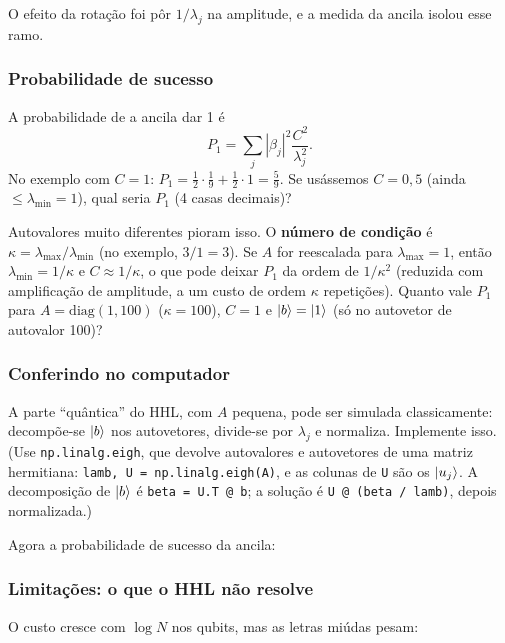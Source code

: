 O efeito da rotação foi pôr \(1/\lambda_j\) na amplitude, e a medida da ancila isolou esse ramo.

\subsubsection{Probabilidade de sucesso}\label{probabilidade-de-sucesso}

A probabilidade de a ancila dar 1 é
\[
P_1=\sum_j|\beta_j|^2\frac{C^2}{\lambda_j^2}.
\]
No exemplo com \(C=1\): \(P_1=\tfrac12\cdot\tfrac19+\tfrac12\cdot1=\tfrac59\). Se usássemos \(C=0{,}5\) (ainda \(\le\lambda_{\min}=1\)), qual seria \(P_1\) (4 casas decimais)?

Autovalores muito diferentes pioram isso. O \textbf{número de condição} é \(\kappa=\lambda_{\max}/\lambda_{\min}\) (no exemplo, \(3/1=3\)). Se \(A\) for reescalada para \(\lambda_{\max}=1\), então \(\lambda_{\min}=1/\kappa\) e \(C\approx1/\kappa\), o que pode deixar \(P_1\) da ordem de \(1/\kappa^2\) (reduzida com amplificação de amplitude, a um custo de ordem \(\kappa\) repetições). Quanto vale \(P_1\) para \(A=\mathrm{diag}(1,100)\) (\(\kappa=100\)), \(C=1\) e \(\left|{b}\right>=\left|{1}\right>\) (só no autovetor de autovalor 100)?

\subsubsection{Conferindo no computador}\label{conferindo-no-computador}

A parte ``quântica'' do HHL, com \(A\) pequena, pode ser simulada classicamente: decompõe-se \(\left|{b}\right>\) nos autovetores, divide-se por \(\lambda_j\) e normaliza. Implemente isso. (Use \texttt{np.linalg.eigh}, que devolve autovalores e autovetores de uma matriz hermitiana: \texttt{lamb,\ U\ =\ np.linalg.eigh(A)}, e as colunas de \texttt{U} são os \(\left|{u_j}\right>\). A decomposição de \(\left|{b}\right>\) é \texttt{beta\ =\ U.T\ @\ b}; a solução é \texttt{U\ @\ (beta\ /\ lamb)}, depois normalizada.)

Agora a probabilidade de sucesso da ancila:

\subsubsection{\texorpdfstring{Limitações: o que o HHL \textbf{não} resolve}{Limitações: o que o HHL não resolve}}\label{limitauxe7uxf5es-o-que-o-hhl-nuxe3o-resolve}

O custo cresce com \(\log N\) nos qubits, mas as letras miúdas pesam:

